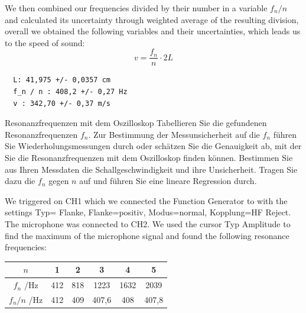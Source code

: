 We then combined our frequencies divided by their number in a variable $f_n /n$ and calculated its uncertainty through weighted average of the resulting division, overall we obtained the following variables and their uncertainties, which leads us to the speed of sound:
$$
v = \frac{f_{n}}{n} \cdot 2 L
$$
\begin{verbatim}
  L: 41,975 +/- 0,0357 cm
  f_n / n : 408,2 +/- 0,27 Hz
  v : 342,70 +/- 0,37 m/s
\end{verbatim}

























\begin{aufgabe}{Resonanzfrequenzen mit dem Oszilloskop}
  Tabellieren Sie die gefundenen Resonanzfrequenzen $f_n$. Zur
  Bestimmung der Messunsicherheit auf die $f_n$ führen Sie
  Wiederholungsmessungen durch oder schätzen Sie die Genauigkeit ab,
  mit der Sie die Resonanzfrequenzen mit dem Oszilloskop finden
  können. Bestimmen Sie aus Ihren Messdaten die Schallgeschwindigkeit
  und ihre Unsicherheit. Tragen Sie dazu die $f_n$ gegen $n$ auf und
  führen Sie eine lineare Regression durch.
\end{aufgabe}

We triggered on CH1 which we connected the Function Generator to with the settings Typ= Flanke, Flanke=positiv, Modus=normal, Kopplung=HF Reject. The microphone was connected to CH2. We used the cursor Typ Amplitude to find the maximum of the microphone signal and found the following resonance frequencies:

\begin{table}[H]
\begin{tabular}{@{}c c c c c c@{}}
\hline
 $n$ & 1 & 2 & 3 & 4 & 5 \\
\hline
$f_n$ /Hz & 412 & 818 & 1223 & 1632 & 2039 \\
\hline
$f_n/n$ /Hz & 412 & 409 & 407,6 & 408 & 407,8\\
\hline
\end{tabular}
\end{table}


